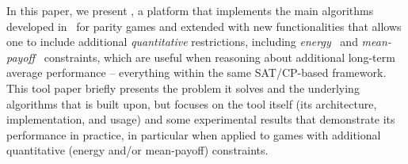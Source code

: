 \documentclass[runningheads]{llncs}
\begin{document}
%
In this paper, we present \nocq, a platform that implements the main algorithms developed in~\cite{Hernandez:2026:noc} for parity games and extended with new functionalities that allows one to include additional {\em quantitative} restrictions, including {\em energy}~\cite{ChatterjeeD12} and {\em mean-payoff}~\cite{ChatterjeeHS17} constraints, which are useful when reasoning about additional long-term average performance -- everything within the same SAT/CP-based framework. This tool paper briefly presents the problem it solves and the underlying algorithms that \nocq is built upon, but focuses on the tool itself (its architecture, implementation, and usage) and some experimental results that demonstrate its performance in practice, in particular when applied to games with additional quantitative (energy and/or mean-payoff) constraints. 


\end{document}

